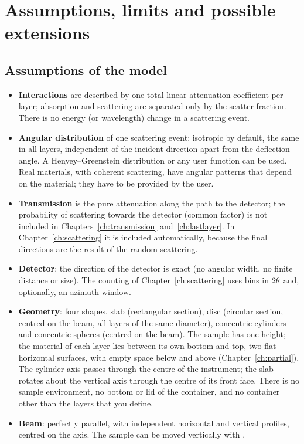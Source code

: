 \chapter{Assumptions, limits and possible extensions}
\label{ch:limits}

\section{Assumptions of the model}

\begin{itemize}
  \item \textbf{Interactions} are described by one total linear attenuation coefficient per layer; absorption and scattering are separated only by the
        scatter fraction. There is no energy (or wavelength) change in a scattering event.
  \item \textbf{Angular distribution} of one scattering event: isotropic by default, the same in all layers, independent of the incident direction apart from the
        deflection angle. A Henyey--Greenstein distribution or any user function can be used. Real materials, with coherent scattering, have angular patterns that depend
        on the material; they have to be provided by the user.
  \item \textbf{Transmission} is the pure attenuation along the path to the detector; the probability of scattering towards the detector (common factor) is not included
        in Chapters~\ref{ch:transmission} and~\ref{ch:lastlayer}. In Chapter~\ref{ch:scattering} it is included automatically, because the final directions are the result of the
        random scattering.
  \item \textbf{Detector}: the direction of the detector is exact (no angular width, no finite distance or size). The counting of Chapter~\ref{ch:scattering} uses bins in
        $2\theta$ and, optionally, an azimuth window.
  \item \textbf{Geometry}: four shapes, slab (rectangular section), disc (circular section, centred on the beam, all layers of the same
        diameter), concentric cylinders and concentric spheres (centred on the beam). The sample has one height; the material of each layer lies between its own bottom and top, two flat horizontal surfaces,
        with empty space below and above (Chapter~\ref{ch:partial}). The cylinder axis passes through the centre of the instrument; the slab rotates
        about the vertical axis through the centre of its front face. There is no sample environment, no bottom or lid of the container, and no container other than the layers that you define.
  \item \textbf{Beam}: perfectly parallel, with independent horizontal and vertical profiles, centred on the axis. The sample can be moved vertically with .
\end{itemize}

